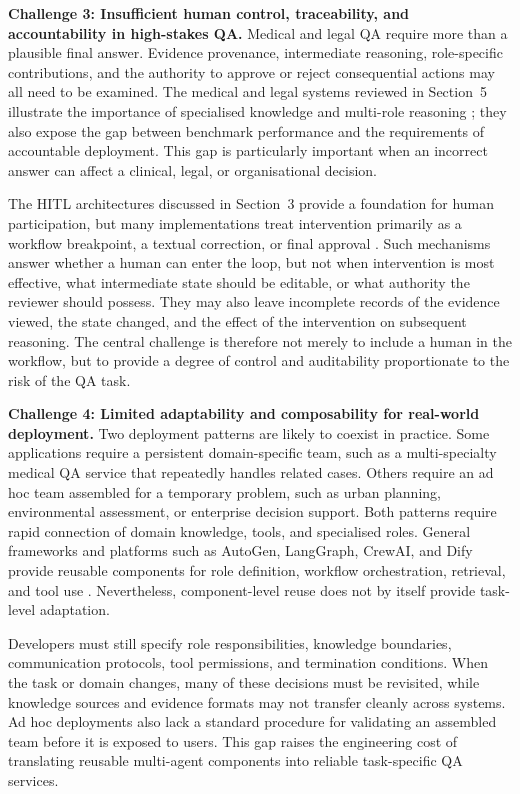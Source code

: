 \textbf{Challenge 3: Insufficient human control, traceability, and
accountability in high-stakes QA.}
Medical and legal QA require more than a plausible final answer. Evidence
provenance, intermediate reasoning, role-specific contributions, and the
authority to approve or reject consequential actions may all need to be
examined. The medical and legal systems reviewed in Section~5 illustrate the
importance of specialised knowledge and multi-role reasoning
\citep{tang2024medagents,cui2023chatlaw}; they also expose the gap between
benchmark performance and the requirements of accountable deployment. This
gap is particularly important when an incorrect answer can affect a clinical,
legal, or organisational decision.

The HITL architectures discussed in Section~3 provide a foundation for human
participation, but many implementations treat intervention primarily as a
workflow breakpoint, a textual correction, or final approval
\citep{duan2024langgraph_crewai,langgraph2024}. Such mechanisms answer whether
a human can enter the loop, but not when intervention is most effective, what
intermediate state should be editable, or what authority the reviewer should
possess. They may also leave incomplete records of the evidence viewed, the
state changed, and the effect of the intervention on subsequent reasoning.
The central challenge is therefore not merely to include a human in the
workflow, but to provide a degree of control and auditability proportionate to
the risk of the QA task.

\textbf{Challenge 4: Limited adaptability and composability for real-world
deployment.}
Two deployment patterns are likely to coexist in practice. Some applications
require a persistent domain-specific team, such as a multi-specialty medical
QA service that repeatedly handles related cases. Others require an ad hoc
team assembled for a temporary problem, such as urban planning, environmental
assessment, or enterprise decision support. Both patterns require rapid
connection of domain knowledge, tools, and specialised roles. General
frameworks and platforms such as AutoGen, LangGraph, CrewAI, and Dify provide
reusable components for role definition, workflow orchestration, retrieval,
and tool use \citep{wu2024autogen,langgraph2024,crewai2023,dify2024}.
Nevertheless, component-level reuse does not by itself provide task-level
adaptation.

Developers must still specify role responsibilities, knowledge boundaries,
communication protocols, tool permissions, and termination conditions. When
the task or domain changes, many of these decisions must be revisited, while
knowledge sources and evidence formats may not transfer cleanly across
systems. Ad hoc deployments also lack a standard procedure for validating an
assembled team before it is exposed to users. This gap raises the engineering
cost of translating reusable multi-agent components into reliable
task-specific QA services.

